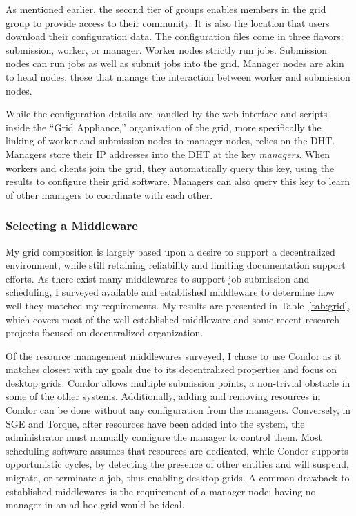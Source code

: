 As mentioned earlier, the second tier of groups enables members in the grid
group to provide access to their community.  It is also the location that users
download their configuration data.  The configuration files come in three
flavors: submission, worker, or manager.  Worker nodes strictly run jobs.
Submission nodes can run jobs as well as submit jobs into the grid.  Manager
nodes are akin to head nodes, those that manage the interaction between worker
and submission nodes.

While the configuration details are handled by the web interface and scripts
inside the ``Grid Appliance,'' organization of the grid, more specifically the
linking of worker and submission nodes to manager nodes, relies on the DHT.
Managers store their IP addresses into the DHT at the key \emph{managers}.
When workers and clients join the grid, they automatically query this key,
using the results to configure their grid software.  Managers can also query
this key to learn of other managers to coordinate with each other.

\subsubsection{Selecting a Middleware}

My grid composition is largely based upon a desire to support a decentralized
environment, while still retaining reliability and limiting documentation
support efforts.  As there exist many middlewares to support job submission and
scheduling, I surveyed available and established middleware to determine how
well they matched my requirements.  My results are presented in
Table~\ref{tab:grid}, which covers most of the well established middleware and
some recent research projects focused on decentralized organization.

Of the resource management middlewares surveyed, I chose to use Condor as it
matches closest with my goals due to its decentralized properties and focus on
desktop grids.  Condor allows multiple submission points, a non-trivial
obstacle in some of the other systems.  Additionally, adding and removing
resources in Condor can be done without any configuration from the managers.
Conversely, in SGE and Torque, after resources have been added into the system,
the administrator must manually configure the manager to control them.  Most
scheduling software assumes that resources are dedicated, while Condor supports
opportunistic cycles, by detecting the presence of other entities and will
suspend, migrate, or terminate a job, thus enabling desktop grids.  A common
drawback to established middlewares is the requirement of a manager node;
having no manager in an ad hoc grid would be ideal.

